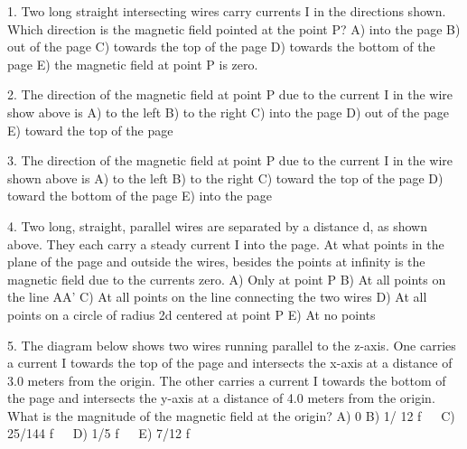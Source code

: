 





1. Two long straight intersecting wires carry currents I in the
directions shown.
Which direction is the magnetic field pointed at the
point P?
A) into the page
B) out of the page
C) towards the top of the page
D) towards the bottom of the page
E) the magnetic field at point P is zero.


2.
The direction of the magnetic field at point P due to the
current I in the wire show above is
A) to the left
B) to the right
C) into the page
D) out of the page
E) toward the top of the page



3.
The direction of the magnetic field at point P due to the
current I in the wire shown above is
A) to the left
B) to the right
C) toward the top of the page
D) toward the bottom of the page
E) into the page


4. %
Two long, straight, parallel wires are separated by a
distance d, as shown above. They each carry a steady
current I into the page. At what points in the plane of the
page and outside the wires, besides the points at infinity is
the magnetic field due to the currents zero.
A) Only at point P
B) At all points on the line AA'
C) At all points on the line connecting the two wires
D) At all points on a circle of radius 2d centered at point P
E) At no points




5. The diagram below shows two wires running parallel to the
z-axis. One carries a current I towards the top of the page
and intersects the x-axis at a distance of 3.0 meters from the
origin. The other carries a current I towards the bottom of
the page and intersects the y-axis at a distance of 4.0 meters
from the origin.
What is the magnitude of the magnetic field at the origin?
A) 0
B) 1/ 12 ƒ  
C) 25/144 ƒ  
D) 1/5 ƒ  
E) 7/12 ƒ  


